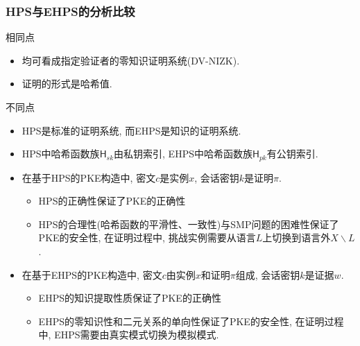 \subsubsection{HPS与EHPS的分析比较}
\begin{trivlist}
\item 相同点
\begin{itemize}
    \item 均可看成指定验证者的零知识证明系统(DV-NIZK). 
    \item 证明的形式是哈希值.  
\end{itemize}

\item 不同点
\begin{itemize}
    \item HPS是标准的证明系统, 而EHPS是知识的证明系统. 

    \item HPS中哈希函数族$\mathsf{H}_{sk}$由私钥索引, EHPS中哈希函数族$\mathsf{H}_{pk}$有公钥索引. 

    \item 在基于HPS的PKE构造中, 密文$c$是实例$x$, 会话密钥$k$是证明$\pi$. 
    \begin{itemize}
        \item HPS的正确性保证了PKE的正确性 
        \item HPS的合理性(哈希函数的平滑性、一致性)与SMP问题的困难性保证了PKE的安全性, 
        	在证明过程中, 挑战实例需要从语言$L$上切换到语言外$X \backslash L$. 
    \end{itemize}

    \item 在基于EHPS的PKE构造中, 密文$c$由实例$x$和证明$\pi$组成, 会话密钥$k$是证据$w$.
    \begin{itemize}
        \item EHPS的知识提取性质保证了PKE的正确性
        \item EHPS的零知识性和二元关系的单向性保证了PKE的安全性, 在证明过程中, EHPS需要由真实模式切换为模拟模式. 
    \end{itemize}
\end{itemize}
\end{trivlist}


